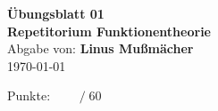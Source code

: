 \documentclass{article}
\def\sheetNumber{01}
\def\names{Linus Mußmächer}
\def\sumPoints{60}
\begin{document}
\begin{doublespace}
	\begin{center}
		\textbf{\Large{Übungsblatt \sheetNumber}}\\
		\textbf{\Large{Repetitorium Funktionentheorie}}\\
		Abgabe von: \textbf{\names}\\
		\today
	\end{center}
	\hfill  {\large Punkte: $\boxed{\qquad  /\; \sumPoints}$}\\
\end{doublespace}



\end{document}
